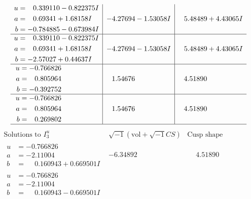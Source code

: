\documentclass[1p]{elsarticle_modified}
\theoremstyle{definition}
\newcommand{\I}{\sqrt{-1}}
\begin{document}
$$\begin{array}{c|c|c}
\begin{aligned}
u &= \phantom{-}0.339110 - 0.822375 I \\
a &= \phantom{-}0.69341 + 1.68158 I \\
b &= -0.784885 - 0.673984 I\end{aligned}
 & -4.27694 - 1.53058 I & \phantom{-}5.48489 + 4.43065 I \\ \hline\begin{aligned}
u &= \phantom{-}0.339110 - 0.822375 I \\
a &= \phantom{-}0.69341 + 1.68158 I \\
b &= -2.57027 + 0.44637 I\end{aligned}
 & -4.27694 - 1.53058 I & \phantom{-}5.48489 + 4.43065 I \\ \hline\begin{aligned}
u &= -0.766826\phantom{ +0.000000I} \\
a &= \phantom{-}0.805964\phantom{ +0.000000I} \\
b &= -0.392752\phantom{ +0.000000I}\end{aligned}
 & \phantom{-}1.54676\phantom{ +0.000000I} & \phantom{-}4.51890\phantom{ +0.000000I} \\ \hline\begin{aligned}
u &= -0.766826\phantom{ +0.000000I} \\
a &= \phantom{-}0.805964\phantom{ +0.000000I} \\
b &= \phantom{-}0.269802\phantom{ +0.000000I}\end{aligned}
 & \phantom{-}1.54676\phantom{ +0.000000I} & \phantom{-}4.51890\phantom{ +0.000000I}\\
 \hline 
 \end{array}$$\newpage$$\begin{array}{c|c|c}  
\text{Solutions to }I^u_{3}& \I (\text{vol} + \sqrt{-1}CS) & \text{Cusp shape}\\
 \hline 
\begin{aligned}
u &= -0.766826\phantom{ +0.000000I} \\
a &= -2.11004\phantom{ +0.000000I} \\
b &= \phantom{-}0.160943 + 0.669501 I\end{aligned}
 & -6.34892\phantom{ +0.000000I} & \phantom{-}4.51890\phantom{ +0.000000I} \\ \hline\begin{aligned}
u &= -0.766826\phantom{ +0.000000I} \\
a &= -2.11004\phantom{ +0.000000I} \\
b &= \phantom{-}0.160943 - 0.669501 I\end{aligned}

\end{array}$$
\end{document}
